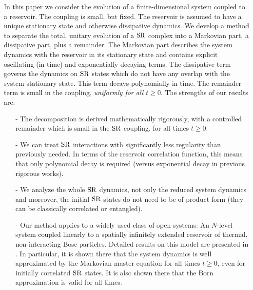 \documentclass[letterpaper,onecolumn,11pt,accepted=2021-12-09]{quantumarticle}
\numberwithin{equation}{section}
\renewcommand{\r}{{\rm R}}
\newcommand{\s}{{\rm S}}
\begin{document}
In this paper we consider the evolution of a finite-dimensional system coupled to a reservoir. The coupling is small, but fixed. The reservoir is assumed to have a unique stationary state and otherwise dissipative dynamics. We develop a method to separate the total, unitary evolution of a $\s\r$ complex into a Markovian part, a dissipative part, plus a remainder. The Markovian part describes the system dynamics with the reservoir in its stationary state and contains explicit oscillating (in time) and exponentially decaying terms. The dissipative term governs the dynamics on $\s\r$ states which do not have any overlap with the system stationary state. This term decays polynomially in time. The remainder term is small in the coupling, {\em uniformly for all $t\ge 0$}. The strengths of our results are:
\begin{itemize}
	\item[-] The decomposition is derived mathematically rigorously, with a controlled remainder which is small in the $\s\r$ coupling, for all times $t\ge0$.
	\item[-] We can treat $\s\r$  interactions with significantly less regularity than previously needed. In terms of the reservoir correlation function, this means that only polynomial decay is required (versus exponential decay in previous rigorous works).
	\item[-] We analyze the whole $\s\r$ dynamics, not only the reduced system dynamics and moreover, the initial $\s\r$ states do not need to be of product form (they can be classically correlated or entangled).
	\item[-] Our method applies to a widely used class of open systems: An $N$-level system coupled linearly to a spatially infinitely extended reservoir of thermal, non-interacting Bose particles. Detailed results on this model are presented in \cite{Markov2,Mcorr}. In particular, it is shown there that the system dynamics is well approximated by the Markovian master equation for all times $t\ge0$, even for initially correlated $\s\r$ states. It is also shown there that the Born approximation is valid for all times.
\end{itemize} 
\end{document}
